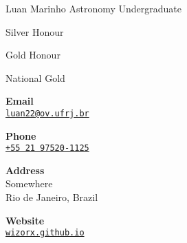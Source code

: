 \documentclass{article}
\begin{document}
\begin{cv}[avatar]{Luan Marinho }{Astronomy Undergraduate}
\begin{cvevent}[2021]
Silver Honour
\end{cvevent}

\begin{cvevent}[2020]
    Gold Honour
\end{cvevent}


\begin{cvevent}[2019]
    National Gold
\end{cvevent}


\cvsidebar %


\begin{cvitem}[Envelope][0.6]
    \textbf{Email}\\
    \href{mailto:james.bond@mi6.gov}{\texttt{luan22@ov.ufrj.br}}
\end{cvitem}

\cvseparator[3]
\begin{cvitem}[Phone][0.6]
    \textbf{Phone}\\
    \href{tel:+5521975201125}{\texttt{+55 21 97520-1125}}
\end{cvitem}

\cvseparator[3]
\begin{cvitem}[Home][0.6]
    \textbf{Address}\\
    Somewhere\\ Rio de Janeiro, Brazil
\end{cvitem}

\cvseparator[3]
\begin{cvitem}[Globe][0.6]
    \textbf{Website}\\
    \href{https://wizorx.github.io}{\texttt{wizorx.github.io}}
\end{cvitem}






\end{cv}
\end{document}
